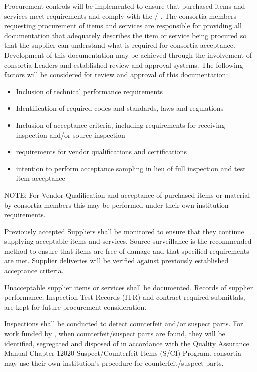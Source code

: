 Procurement controls will be implemented to ensure that purchased
items and services meet  requirements and comply with the
/ .  The consortia members requesting
procurement of items and services are responsible for providing all
documentation that adequately describes the item or service being
procured so that the supplier can understand what is required for
consortia acceptance. Development of this documentation may be
achieved through the involvement of consortia Leaders and established
review and approval systems. The following factors will be considered
for review and approval of this documentation:
\begin{itemize}
 \item Inclusion of technical performance requirements
 \item Identification of required codes and standards, laws and regulations
 \item Inclusion of acceptance criteria, including requirements for
   receiving inspection and/or source inspection
 \item {} requirements for vendor qualifications and certifications
 \item {} intention to perform acceptance sampling in lieu
   of full inspection and test item acceptance
\end{itemize}
NOTE: For Vendor Qualification and acceptance of purchased items or
material by consortia members this may be performed under their own
institution requirements.

Previously accepted Suppliers shall be monitored to ensure that they
continue supplying acceptable items and services. Source surveillance
is the recommended method to ensure that items are free of damage and
that specified requirements are met. Supplier deliveries will be
verified against previously established acceptance criteria.

Unacceptable supplier items or services shall be documented. Records
of supplier performance, Inspection Test Records (ITR) and
contract-required submittals, are kept for future procurement
consideration.

Inspections shall be conducted to detect counterfeit and/or suspect
parts. For work funded by , when counterfeit/suspect parts are
found, they will be identified, segregated and disposed of in
accordance with the \fnal Quality Assurance Manual Chapter 12020
Suspect/Counterfeit Items (S/CI) Program.  consortia may use their
own institution’s procedure for counterfeit/suspect parts.

